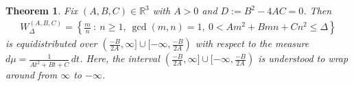\documentclass[11pt,letterpaper,reqno]{amsart}
\newtheorem{theorem}{Theorem}[section]
\numberwithin{equation}{section}
\numberwithin{figure}{section}
\numberwithin{table}{section}
\newcommand{\lrcb}[1]{\left\{#1\right\}}
\newcommand{\RR}{\mathbb{R}}
\begin{document}



{
\renewcommand{\thetheorem}{\ref{thm:equid-WABC} (\(A>0,D=0\))}
\begin{theorem} \label{thm:equid-W--A>0,D=0}
    Fix $(A,B,C) \in \RR^3$ with $A > 0$ and $D := B^2-4AC=0$. Then
    \begin{align}
        W_{\Delta}^{(A,B,C)} = \lrcb{\frac{m}{n}  ~:~ n\ge1,~ \gcd(m,n)=1,~ 0 < A m^2 +B mn + C n^2 \le \Delta} 
    \end{align} 
    is equidistributed over $(\frac{-B}{2A},\infty]\cup[-\infty,\frac{-B}{2A})$ with respect to the measure $d\mu = \frac{1}{At^2+Bt+C} \,dt$. Here, the interval $(\frac{-B}{2A},\infty]\cup[-\infty,\frac{-B}{2A})$ is understood to wrap around from $\infty$ to $-\infty$.
\end{theorem}
\addtocounter{theorem}{-1}
}
\end{document}
